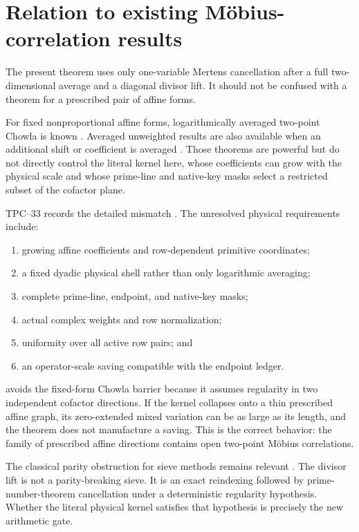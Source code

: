 \section{Relation to existing M\"obius-correlation results}
\label{sec:literature-boundary}

The present theorem uses only one-variable Mertens cancellation after a
full two-dimensional average and a diagonal divisor lift.  It should not
be confused with a theorem for a prescribed pair of affine forms.

For fixed nonproportional affine forms, logarithmically averaged two-point
Chowla is known \citep{Tao2016LogChowla}.  Averaged unweighted results are
also available when an additional shift or coefficient is averaged
\citep{MatomakiRadziwillTao2015}.  Those theorems are powerful but do not
directly control the literal kernel here, whose coefficients can grow with
the physical scale and whose prime-line and native-key masks select a
restricted subset of the cofactor plane.

TPC--33 records the detailed mismatch \citep{WangTPC33}.  The unresolved
physical requirements include:
\begin{enumerate}[label=\textup{(\roman*)}]
 \item growing affine coefficients and row-dependent primitive coordinates;
 \item a fixed dyadic physical shell rather than only logarithmic averaging;
 \item complete prime-line, endpoint, and native-key masks;
 \item actual complex weights and row normalization;
 \item uniformity over all active row pairs; and
 \item an operator-scale saving compatible with the endpoint ledger.
\end{enumerate}

 avoids the fixed-form Chowla barrier
because it assumes regularity in two independent cofactor directions.
If the kernel collapses onto a thin prescribed affine graph, its
zero-extended mixed variation can be as large as its length, and the theorem
does not manufacture a saving.  This is the correct behavior: the family
of prescribed affine directions contains open two-point M\"obius
correlations.

The classical parity obstruction for sieve methods remains relevant
\citep{HeathBrown1982Parity}.  The divisor lift is not a parity-breaking
sieve.  It is an exact reindexing followed by prime-number-theorem
cancellation under a deterministic regularity hypothesis.  Whether the
literal physical kernel satisfies that hypothesis is precisely the new
arithmetic gate.
